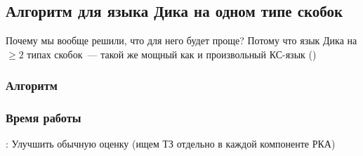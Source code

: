 \subsection{Алгоритм для языка Дика на одном типе скобок}

Почему мы вообще решили, что для него будет проще? Потому что язык Дика на $\ge 2$ типах скобок~--- такой же мощный как и произвольный КС-язык ()

\subsubsection{Алгоритм}

\subsubsection{Время работы}

\TODO: Улучшить обычную оценку (ищем ТЗ отдельно в каждой компоненте РКА)